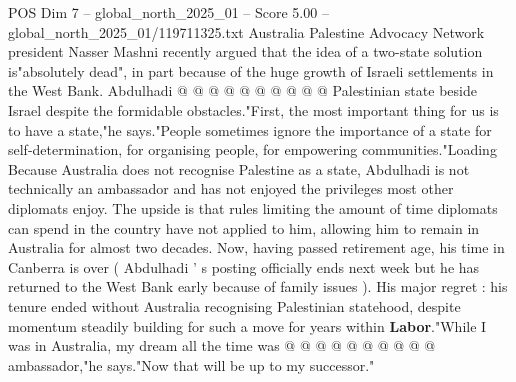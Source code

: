 \begin{textsample}{POS Dim 7 – global\_north\_2025\_01 – Score 5.00 – global\_north\_2025\_01/119711325.txt}
Australia Palestine Advocacy Network president Nasser Mashni recently argued that the idea of a two-state solution is"absolutely dead", in part because of the huge growth of Israeli settlements in the West Bank.
Abdulhadi @ @ @ @ @ @ @ @ @ @ Palestinian state beside Israel despite the formidable obstacles."First, the most important thing for us is to have a state,"he says."People sometimes ignore the importance of a state for self-determination, for organising people, for empowering communities."Loading Because Australia does not recognise Palestine as a state, Abdulhadi is not technically an ambassador and has not enjoyed the privileges most other diplomats enjoy.
The upside is that rules limiting the amount of time diplomats can spend in the country have not applied to him, allowing him to remain in Australia for almost two decades.
Now, having passed retirement age, his time in Canberra is over ( Abdulhadi ' s posting officially ends next week but he has returned to the West Bank early because of family issues ).
His major regret : his tenure ended without Australia recognising Palestinian statehood, despite momentum steadily building for such a move for years within \textbf{Labor}."While I was in Australia, my dream all the time was @ @ @ @ @ @ @ @ @ @ ambassador,"he says."Now that will be up to my successor."

\end{textsample}
